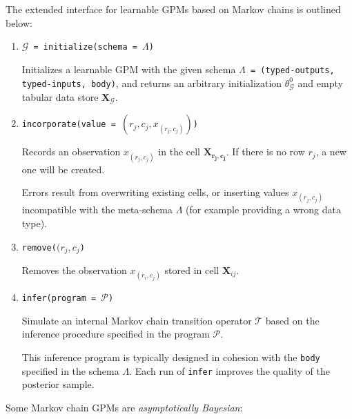 \documentclass[10pt,letterpaper]{article}
\begin{document}
The extended interface for learnable GPMs based on Markov chains is outlined
below:

\begin{enumerate}

\item \texttt{$\mathcal{G}$ = initialize(schema = $\Lambda$)}

    Initializes a learnable GPM with the given schema \texttt{$\Lambda$ =
    (typed-outputs, typed-inputs, body)}, and returns an arbitrary
    initialization $\theta_\mathcal{G}^0$ and empty tabular data store
    $\mathbf{X}_\mathcal{G}$.


\item \texttt{incorporate(value = $(r_j,c_j,x_{(r_j,c_j)})$)}

    Records an observation $x_{(r_j,c_j)}$ in the cell $\mathbf{X_{r_j,c_j}}$.
    If there is no row $r_j$, a new one will be created.

    Errors result from overwriting existing cells, or inserting values
    $x_{(r_j,c_j)}$ incompatible with the meta-schema $\Lambda$ (for example
    providing a wrong data type).

\item \texttt{remove($(r_j,c_j$)}

    Removes the observation $x_{(r_i,c_j)}$ stored in cell $\mathbf{X}_{ij}$.

\item \texttt{infer(program = $\mathcal{P}$)}

    Simulate an internal Markov chain transition operator $\mathcal{T}$ based on
    the inference procedure specified in the program $\mathcal{P}$.

    This inference program is typically designed in cohesion with the
    \texttt{body} specified in the schema $\Lambda$. Each run of \texttt{infer}
    improves the quality of the posterior sample.
\end{enumerate}

Some Markov chain GPMs are \textit{asymptotically Bayesian}:
\end{document}
